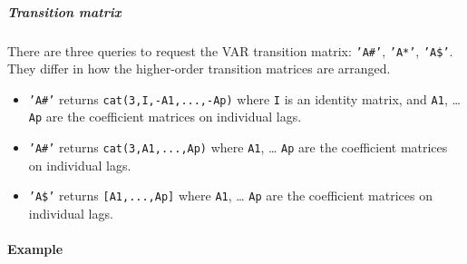 \subparagraph{Transition matrix}

There are three queries to request the VAR transition matrix:
\texttt{'A\#'}, \texttt{'A*'}, \texttt{'A\$'}. They differ in how the
higher-order transition matrices are arranged.

\begin{itemize}
\item
  \texttt{'A\#'} returns \texttt{cat(3,I,-A1,...,-Ap)} where \texttt{I}
  is an identity matrix, and \texttt{A1}, \ldots{} \texttt{Ap} are the
  coefficient matrices on individual lags.
\item
  \texttt{'A\#'} returns \texttt{cat(3,A1,...,Ap)} where \texttt{A1},
  \ldots{} \texttt{Ap} are the coefficient matrices on individual lags.
\item
  \texttt{'A\$'} returns \texttt{{[}A1,...,Ap{]}} where \texttt{A1},
  \ldots{} \texttt{Ap} are the coefficient matrices on individual lags.
\end{itemize}

\paragraph{Example}


